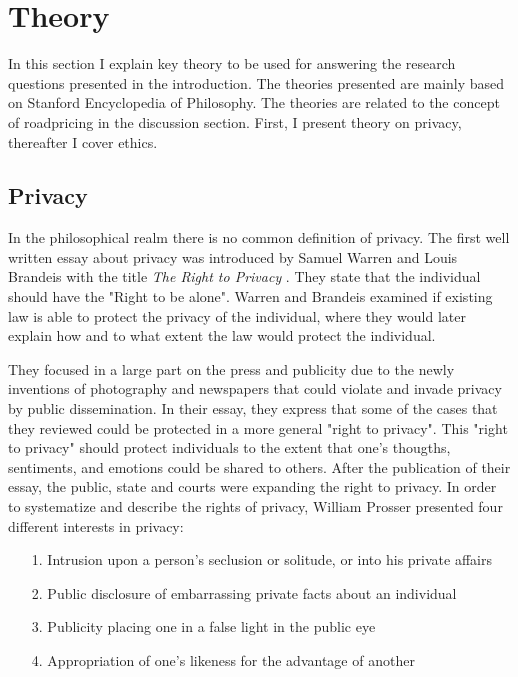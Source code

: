\section{Theory}
In this section I explain key theory to be used for answering the research questions presented in the introduction. The theories presented are mainly based on Stanford Encyclopedia of Philosophy. The theories are related to the concept of roadpricing in the discussion section. First, I present theory on privacy, thereafter I cover ethics. 

\subsection{Privacy}
In the philosophical realm there is no common definition of privacy. 
The first well written essay about privacy was introduced by Samuel Warren and Louis Brandeis with the title \textit{The Right to Privacy} \cite{wb:1890}. They state that the individual should have the "Right to be alone". Warren and Brandeis examined if existing law is able to protect the privacy of the individual, where they would later explain how and to what extent the law would protect the individual. 

They focused in a large part on the press and publicity due to the newly inventions of photography and newspapers that could violate and invade privacy by public dissemination. In their essay, they express that some of the cases that they reviewed could be protected in a more general "right to privacy". This "right to privacy" should protect individuals to the extent that one's thougths, sentiments, and emotions could be shared to others. After the publication of their essay, the public, state and courts were expanding the right to privacy. In order to systematize and describe the rights of privacy, William Prosser presented four different interests in privacy:
\begin{itemize}
    \item[1.] Intrusion upon a person's seclusion or solitude, or into his private affairs
    \item[2.] Public disclosure of embarrassing private facts about an individual 
    \item[3.] Publicity placing one in a false light in the public eye
    \item[4.] Appropriation of one's likeness for the advantage of another \cite[p. 389]{prosser:1960} 
\end{itemize}

